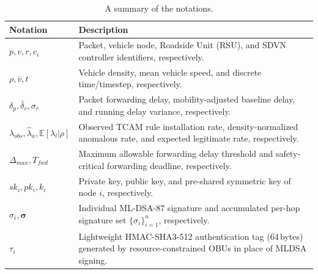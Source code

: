 \documentclass[12pt, a4paper]{report}
\begin{document}
\begin{table}[H]
        \scriptsize
        \begin{center}
                \caption{A summary of the notations.}
                \label{tab_notations}
                \begin{tabular}{| m{2.50cm} | m{8.5cm} |}
                        \hline
                        \textbf{Notation} & \textbf{Description} \\
                        \hline
                        $p, v, r, c_i$ & Packet, vehicle node, Roadside Unit (RSU), and SDVN controller identifiers, respectively. \\
                        \hline
                        $\rho, \bar{v}, t$ & Vehicle density, mean vehicle speed, and discrete time/timestep, respectively. \\
                        \hline
                        $\delta_p, \bar{\delta}_r, \sigma_r$ & Packet forwarding delay, mobility-adjusted baseline delay, and running delay variance, respectively. \\
                        \hline
                        $\lambda_{obs}, \hat{\lambda}_a, \mathbb{E}[\lambda_l|\rho]$ & Observed TCAM rule installation rate, density-normalized anomalous rate, and expected legitimate rate, respectively. \\
                        \hline
                        $\Delta_{max}, T_{fwd}$ & Maximum allowable forwarding delay threshold and safety-critical forwarding deadline, respectively. \\
                        \hline
                        $sk_i, pk_i, k_i$ & Private key, public key, and pre-shared symmetric key of node $i$, respectively. \\
                        \hline
                        $\sigma_i, \boldsymbol{\sigma}$ & Individual ML-DSA-87 signature
                        and accumulated per-hop signature set $\{\sigma_i\}_{i=1}^n$,
                        respectively.
                        \\
                        \hline
                        $\tau_i$ & Lightweight
                        HMAC-SHA3-512 authentication
                        tag (64\,bytes) generated by
                        resource-constrained \ac{OBU}s
                        in place of \ac{MLDSA}
                        signing. \\


\end{tabular}
\end{center}
\end{table}
\end{document}

